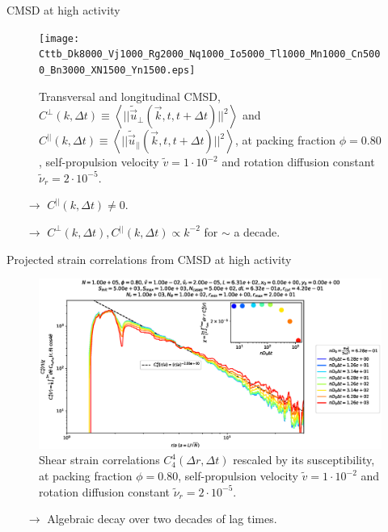 \documentclass{beamer}
\begin{document}
\begin{frame}{CMSD at high activity}

\vspace{-0.2cm}
\begin{figure}[h!]
  \centering
  \texttt{[image: Cttb\_Dk8000\_Vj1000\_Rg2000\_Nq1000\_Io5000\_Tl1000\_Mn1000\_Cn5000\_Bn3000\_XN1500\_Yn1500.eps]}
  \vspace{-0.8cm}
  \caption{Transversal and longitudinal CMSD, $C^{\perp}(k, \Delta t) \equiv \left<||\tilde{\vec{u}}_{\perp}(\vec{k}, t, t  +\Delta t) ||^2\right>$ and $C^{||}(k, \Delta t) \equiv \left<||\tilde{\vec{u}}_{||}(\vec{k}, t, t  +\Delta t) ||^2\right>$, at packing fraction $\phi=0.80$, self-propulsion velocity $\tilde{v}=1\cdot10^{-2}$ and rotation diffusion constant $\tilde{\nu}_r=2\cdot10^{-5}$.}
\end{figure}

\vspace{-0.5cm}
\begin{itemize}
  \item[$\rightarrow$] $C^{||}(k, \Delta t) \neq 0$.
  \item[$\rightarrow$] $C^{\perp}(k, \Delta t), C^{||}(k, \Delta t) \propto k^{-2}$ for $\sim$ a decade.
\end{itemize}

\end{frame}

\begin{frame}{Projected strain correlations from CMSD at high activity}

\vspace{-0.2cm}
\begin{figure}[h!]
  \centering
  \includegraphics[width=\linewidth]{figures/figs/c44_chi_cmsd_comparison_Dk8000_Vj1000_Rg2000_Nq1000_Ll3000_RCUTk4200_interpolated_loglog.eps}
  \vspace{-1.3cm}
  \caption{Shear strain correlations $C_4^4(\Delta r, \Delta t)$ rescaled by its susceptibility, at packing fraction $\phi=0.80$, self-propulsion velocity $\tilde{v}=1\cdot10^{-2}$ and rotation diffusion constant $\tilde{\nu}_r=2\cdot10^{-5}$.}
\end{figure}

\vspace{-0.8cm}
\begin{itemize}
  \item[$\rightarrow$] Algebraic decay over two decades of lag times.
\end{itemize}

\end{frame}
\end{document}

